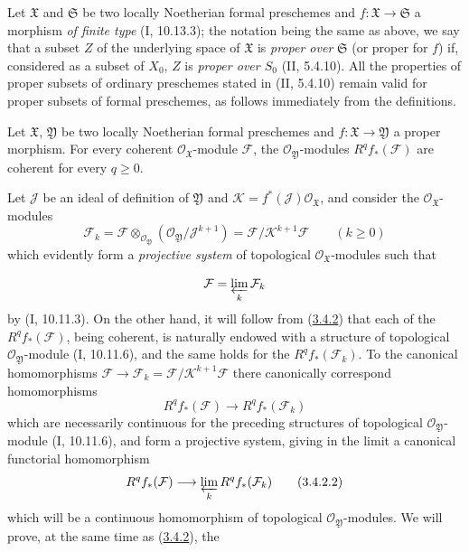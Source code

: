 \begin{env}[3.4.1]
Let $\mathfrak X$ and $\mathfrak S$ be two locally Noetherian formal
preschemes and $f:\mathfrak X\to\mathfrak S$ a morphism \emph{of finite type}
(I, 10.13.3); the notation being the same as above, we say that a
subset $Z$ of the underlying space of $\mathfrak X$ is \emph{proper over}
$\mathfrak S$ (or proper for $f$) if, considered as a subset of $X_0$, $Z$
is \emph{proper over $S_0$} (II, 5.4.10). All the properties of proper
subsets of ordinary preschemes stated in (II, 5.4.10) remain valid
for proper subsets of formal preschemes, as follows immediately from the
definitions.
\end{env}

\begin{theorem}[3.4.2]
\label{III.3.4.2}
Let $\mathfrak X$, $\mathfrak Y$ be two locally Noetherian formal
preschemes and $f:\mathfrak X\to\mathfrak Y$ a proper morphism. For every
coherent $\mathcal O_{\mathfrak X}$-module $\mathcal F$, the
$\mathcal O_{\mathfrak Y}$-modules $R^qf_*(\mathcal F)$ are coherent for
every $q\geq0$.
\end{theorem}

Let $\mathcal J$ be an ideal of definition of $\mathfrak Y$ and
$\mathcal K=f^*(\mathcal J)\mathcal O_{\mathfrak X}$, and consider the
$\mathcal O_{\mathfrak X}$-modules
\[
\mathcal F_k=\mathcal F\otimes_{\mathcal O_{\mathfrak Y}}
(\mathcal O_{\mathfrak Y}/\mathcal J^{k+1})
=\mathcal F/\mathcal K^{k+1}\mathcal F\qquad(k\geq0)
\tag{3.4.2.1}\label{III.3.4.2.1}
\]
which evidently form a \emph{projective system} of topological
$\mathcal O_{\mathfrak X}$-modules such that

\[
\mathcal F=\varprojlim_k\mathcal F_k
\]
by (I, 10.11.3). On the other hand, it will follow from
(\hyperref[III.3.4.2]{3.4.2}) that each of the $R^qf_*(\mathcal F)$, being
coherent, is naturally endowed with a structure of topological
$\mathcal O_{\mathfrak Y}$-module (I, 10.11.6), and the same holds
for the $R^qf_*(\mathcal F_k)$. To the canonical homomorphisms
$\mathcal F\to\mathcal F_k=\mathcal F/\mathcal K^{k+1}\mathcal F$
there canonically correspond homomorphisms
\[
R^qf_*(\mathcal F)\longrightarrow R^qf_*(\mathcal F_k)
\]
which are necessarily continuous for the preceding structures of topological
$\mathcal O_{\mathfrak Y}$-module (I, 10.11.6), and
form a projective system, giving in the limit a canonical functorial
homomorphism
\[
R^qf_*(\mathcal F)\longrightarrow\varprojlim_kR^qf_*(\mathcal F_k)
\tag{3.4.2.2}\label{III.3.4.2.2}
\]
which will be a continuous homomorphism of topological
$\mathcal O_{\mathfrak Y}$-modules. We will prove, at the same time as
(\hyperref[III.3.4.2]{3.4.2}), the


